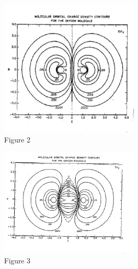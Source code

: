 \documentclass[11pt]{memoir}
\begin{document}
\begin{figure}
	\begin{center}
		\includegraphics[width=0.6\textwidth]{images/mulliken_figure2.png}
	\end{center}
	\caption*{Figure 2}


\end{figure}


\begin{figure}
	\begin{center}
		\includegraphics[width=0.6\textwidth]{images/mulliken_figure3.png}
	\end{center}
	\caption*{Figure 3}


\end{figure}
\end{document}
